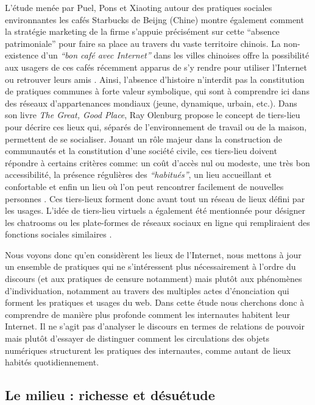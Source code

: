 L’étude menée par Puel, Pons et Xiaoting autour des pratiques sociales environnantes les cafés Starbucks de Beijng (Chine) montre également comment la stratégie marketing de la firme s’appuie précisément sur cette “absence patrimoniale” pour faire sa place au travers du vaste territoire chinois. La non-existence d’un \textit{“bon café avec Internet”} dans les villes chinoises offre la possibilité aux usagers de ces cafés récemment apparus de s’y rendre pour utiliser l’Internet ou retrouver leurs amis \citep{Puel2007}. Ainsi, l’absence d’histoire n’interdit pas la constitution de pratiques communes à forte valeur symbolique, qui sont à comprendre ici dans des réseaux d’appartenances mondiaux (jeune, dynamique, urbain, etc.). Dans son livre \textit{The Great, Good Place}, Ray Olenburg propose le concept de tiers-lieu pour décrire ces lieux qui, séparés de l’environnement de travail ou de la maison, permettent de se socialiser. Jouant un rôle majeur dans la construction de communautés et la constitution d’une société civile, ces tiers-lieu doivent répondre à certains critères comme: un coût d’accès nul ou modeste, une très bon accessibilité, la présence régulières des \textit{``habitués''}, un lieu accueillant et confortable et enfin un lieu où l’on peut rencontrer facilement de nouvelles personnes \citep{Oldenburg1999}.
Ces tiers-lieux forment donc avant tout un réseau de lieux défini par les usages. L’idée de tiers-lieu virtuels a également été mentionnée pour désigner les chatrooms ou les plate-formes de réseaux sociaux en ligne qui rempliraient des fonctions sociales similaires \citep{Soukup2006}. 

Nous voyons donc qu’en considèrent les lieux de l’Internet, nous mettons à jour un ensemble de pratiques qui ne s’intéressent plus nécessairement à l’ordre du discours (et aux pratiques de censure notamment) mais plutôt aux phénomènes d’individuation, notamment au travers des multiples actes d’énonciation qui forment les pratiques et usages du web. Dans cette étude nous cherchons donc à comprendre de manière plus profonde comment les internautes habitent leur Internet. Il ne s’agit pas d’analyser le discours en termes de relations de pouvoir mais plutôt d’essayer de distinguer comment les circulations des objets numériques structurent les pratiques des internautes, comme autant de lieux habités quotidiennement.

\subsection[Le milieu : richesse et désuétude ]{Le milieu : richesse et désuétude }

